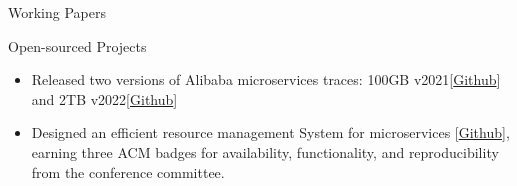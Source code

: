 \documentclass{resume} %
\begin{document}
\begin{rSection}{Working Papers}
\begin{rSection}{Open-sourced Projects}
\begin{itemize}
 \setlength{\itemsep}{0.2em}
    \setlength{\parskip}{0pt}
\item Released two versions of Alibaba microservices traces: 100GB v2021[\href{https://github.com/alibaba/clusterdata/tree/master/cluster-trace-microservices-v2021}{Github}] and 2TB v2022[\href{https://github.com/alibaba/clusterdata/tree/master/cluster-trace-microservices-v2022}{Github}]
\item Designed an efficient resource management System for microservices [\href{https://github.com/Cloud-and-Distributed-Systems/Erms}{Github}], earning three ACM badges for availability, functionality, and reproducibility from the conference committee.
\end{itemize}
\end{rSection}

\vspace{-1em}



\end{rSection}
\end{document}
